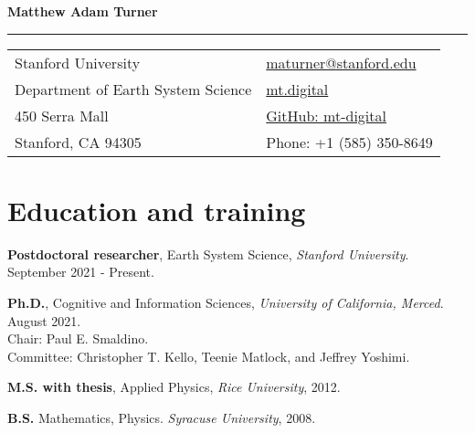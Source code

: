 \documentclass[letterpaper,11pt,oneside]{article}
\begin{document}

\noindent  \textcolor{gunmetal}{\LARGE{\textbf{Matthew Adam Turner}}} \\
\vspace{-2ex}
\hrule 
\normalsize


\begin{center}
\begin{tabular}{l l}
 Stanford University & \hspace{1in} \href{mailto:maturner@stanford.edu}{maturner@stanford.edu} \\
 Department of Earth System Science    & \hspace{1in}  \href{https://mt.digital}{mt.digital}   \\
 450 Serra Mall  & \hspace{1in}  \href{https://github.com/mt-digital}{GitHub: mt-digital}\\
 Stanford, CA 94305 & \hspace{1in} Phone: +1 (585) 350-8649 \\
\end{tabular}
\end{center}


\section*{\textcolor{gunmetal}{Education and training}}

  \begin{hangparas}{0.25in}{1}
    \textbf{Postdoctoral researcher}, Earth System Science, \emph{Stanford University}. September 2021 - Present.

    \textbf{Ph.D.}, Cognitive and Information 
      Sciences, \emph{University of California, Merced}. August 2021. \\ Chair: Paul E. Smaldino. \\ Committee:
    Christopher T. Kello, Teenie Matlock, and Jeffrey Yoshimi. 

    \textbf{M.S. with thesis}, Applied Physics, \emph{Rice University}, 2012.

    \textbf{B.S.} Mathematics, Physics. \emph{Syracuse University}, 2008.
  \end{hangparas}
\end{document}
